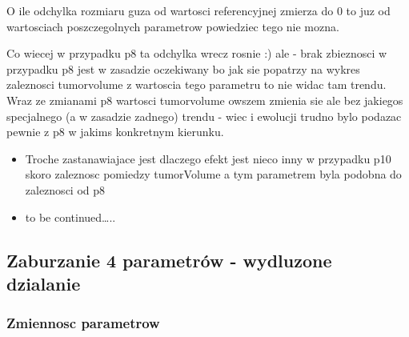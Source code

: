 \documentclass[]{article}
\begin{document}
O ile odchylka rozmiaru guza od wartosci referencyjnej zmierza do 0 to
juz od wartosciach poszczegolnych parametrow powiedziec tego nie mozna.

Co wiecej w przypadku p8 ta odchylka wrecz rosnie :) ale - brak
zbieznosci w przypadku p8 jest w zasadzie oczekiwany bo jak sie popatrzy
na wykres zaleznosci tumorvolume z wartoscia tego parametru to nie widac
tam trendu. Wraz ze zmianami p8 wartosci tumorvolume owszem zmienia sie
ale bez jakiegos specjalnego (a w zasadzie zadnego) trendu - wiec i
ewolucji trudno bylo podazac pewnie z p8 w jakims konkretnym kierunku.

\begin{itemize}
\item
  Troche zastanawiajace jest dlaczego efekt jest nieco inny w przypadku
  p10 skoro zaleznosc pomiedzy tumorVolume a tym parametrem byla podobna
  do zaleznosci od p8
\item
  to be continued\ldots{}..
\end{itemize}

\newpage

\newpage

\subsection{Zaburzanie 4 parametrów - wydluzone
dzialanie}\label{zaburzanie-4-parametruxf3w---wydluzone-dzialanie}

\subsubsection{Zmiennosc parametrow}\label{zmiennosc-parametrow-1}
\end{document}
